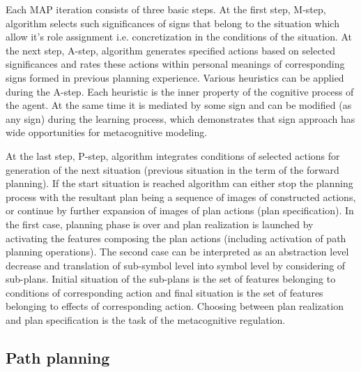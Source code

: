 \documentclass[procedia]{easychair}
\begin{document}
Each MAP iteration consists of three basic steps. At the first step, M-step, algorithm selects such significances of signs that belong to the situation which allow it's role assignment i.e. concretization in the conditions of the situation. At the next step, A-step, algorithm generates specified actions based on selected significances and rates these actions within personal meanings of corresponding signs formed in previous planning experience. Various heuristics can be applied during the A-step. Each heuristic is the inner property of the cognitive process of the agent. At the same time it is mediated by some sign and can be modified (as any sign) during the learning process, which demonstrates that sign approach has wide opportunities for metacognitive modeling.

At the last step, P-step, algorithm integrates conditions of selected actions for generation of the next situation (previous situation in the term of the forward planning). If the start situation is reached algorithm can either stop the planning process with the resultant plan being a sequence of images of constructed actions, or continue by further expansion of images of plan actions (plan specification). In the first case, planning phase is over and plan realization is launched by activating the features composing the plan actions (including activation of path planning operations). The second case can be interpreted as an abstraction level decrease and translation of sub-symbol level into symbol level by considering of sub-plans. Initial situation of the sub-plans is the set of features belonging to conditions of corresponding action and final situation is the set of features belonging to effects of corresponding action. Choosing between plan realization and plan specification is the task of the metacognitive regulation.

\subsection{Path planning}
\label{sect:path}
\end{document}
